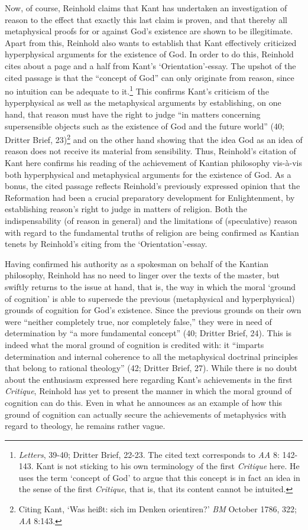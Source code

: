 Now, of course, Reinhold claims that Kant has undertaken an investigation of reason to the effect that exactly this last claim is proven, and that thereby all metaphysical proofs for or against God's existence are shown to be illegitimate. Apart from this, Reinhold also wants to establish that Kant effectively criticized hyperphysical arguments for the existence of God. In order to do this, Reinhold cites about a page and a half from Kant's `Orientation'{-}essay. The upshot of the cited passage is that the ``concept of God'' can only originate from reason, since no intuition can be adequate to it.\footnote{ \textit{Letters}, 39{-}40; Dritter Brief, 22{-}23. The cited text corresponds to \textit{AA} 8: 142{-}143. Kant is not sticking to his own terminology of the first \textit{Critique} here. He uses the term `concept of God' to argue that this concept is in fact an idea in the sense of the first \textit{Critique}, that is, that its content cannot be intuited. } This confirms Kant's criticism of the hyperphysical as well as the metaphysical arguments by establishing, on one hand, that reason must have the right to judge ``in matters concerning supersensible objects such as the existence of God and the future world'' (40; Dritter Brief, 23)\footnote{ Citing Kant, `Was hei\ss{}t: sich im Denken orientiren?' \textit{BM }October 1786, 322; \textit{AA} 8:143.} and on the other hand showing that the idea God as an idea of reason does not receive its material from sensibility. Thus, Reinhold's citation of Kant here confirms his reading of the achievement of Kantian philosophy vis{-}\`{a}{-}vis both hyperphysical and metaphysical arguments for the existence of God. As a bonus, the cited passage reflects Reinhold's previously expressed opinion that the Reformation had been a crucial preparatory development for Enlightenment, by establishing reason's right to judge in matters of religion. Both the indispensability (of reason in general) and the limitations of (speculative) reason with regard to the fundamental truths of religion are being confirmed as Kantian tenets by Reinhold's citing from the `Orientation'{-}essay. 

 Having confirmed his authority as a spokesman on behalf of the Kantian philosophy, Reinhold has no need to linger over the texts of the master, but swiftly returns to the issue at hand, that is, the way in which the moral `ground of cognition' is able to supersede the previous (metaphysical and hyperphysical) grounds of cognition for God's existence. Since the previous grounds on their own were ``neither completely true, nor completely false,'' they were in need of determination by ``a more fundamental concept'' (40; Dritter Brief, 24). This is indeed what the moral ground of cognition is credited with: it ``imparts determination and internal coherence to all the metaphysical doctrinal principles that belong to rational theology'' (42; Dritter Brief, 27). While there is no doubt about the enthusiasm expressed here regarding Kant's achievements in the first \textit{Critique}, Reinhold has yet to present the manner in which the moral ground of cognition can do this. Even in what he announces as an example of how this ground of cognition can actually secure the achievements of metaphysics with regard to theology, he remains rather vague.

